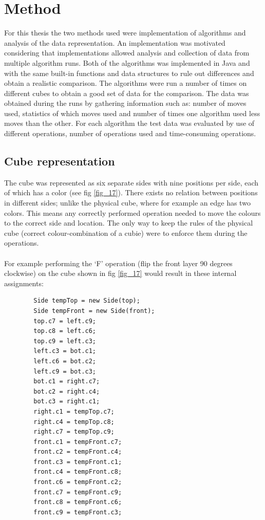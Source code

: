 \documentclass[a4paper,11pt]{kth-mag}
\begin{document}
\chapter{Method}
For this thesis the two methods used were implementation of algorithms and analysis of the data representation. An implementation was motivated considering that implementations allowed analysis and collection of data from multiple algorithm runs.
Both of the algorithms was implemented in Java and with the same built-in functions and data structures to rule out differences and obtain a realistic comparison.
The algorithms were run a number of times on different cubes to obtain a good set of data for the comparison. The data was obtained during the runs by gathering information such as: number of moves used, statistics of which moves used and number of times one algorithm used less moves than the other.  
For each algorithm the test data was evaluated by use of different operations, number of operations used and time-consuming operations.


\section{Cube representation}
 The cube was represented as six separate sides with nine positions per side, each of which has a color (see fig \ref{fig_17}). There exists no relation between positions in different sides; unlike the physical cube, where for example an edge has two colors. This means any correctly performed operation needed to move the colours to the correct side and location. The only way to keep the rules of the physical cube (correct colour-combination of a cubie) were to enforce them during the operations.\\\\
 For example performing the `F' operation (flip the front layer 90 degrees clockwise) on the cube shown in fig \ref{fig_17} would result in these internal assignments:
 \begin{verbatim}
		Side tempTop = new Side(top);
		Side tempFront = new Side(front);
		top.c7 = left.c9;
		top.c8 = left.c6;
		top.c9 = left.c3;
		left.c3 = bot.c1;
		left.c6 = bot.c2;
		left.c9 = bot.c3;
		bot.c1 = right.c7;
		bot.c2 = right.c4;
		bot.c3 = right.c1;
		right.c1 = tempTop.c7;
		right.c4 = tempTop.c8;
		right.c7 = tempTop.c9;
		front.c1 = tempFront.c7;
		front.c2 = tempFront.c4;
		front.c3 = tempFront.c1;
		front.c4 = tempFront.c8;
		front.c6 = tempFront.c2;
		front.c7 = tempFront.c9;
		front.c8 = tempFront.c6;
		front.c9 = tempFront.c3;
\end{verbatim}
\end{document}
